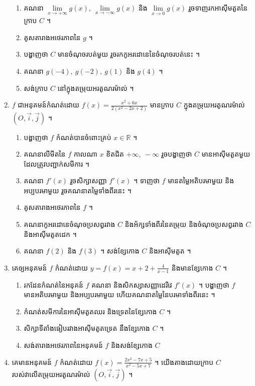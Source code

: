 \documentclass[12pt, a4paper]{article}
\begin{document}
\begin{enumerate}[m]
		\begin{enumerate}[k]
			\item គណនា $\lim\limits_{x\to+\infty}g(x),~\lim\limits_{x\to-\infty}g(x)$ និង $\lim\limits_{x\to0}g(x)$ រួចទាញរកអាស៊ីមតូតនៃក្រាប $C$ ។
			\item គូសតារាងអថេរភាពនៃ $g$ ។
			\item បង្ហាញថា $C$ មានចំណុចរបត់មួយ រួចរកកូអរដោនេនៃចំណុចរបត់នេះ ។
			\item គណនា $g(-4),~g(-2),~g(1)$ និង $g(4)$ ។
			\item សង់ក្រាប $C$ នៅក្នុងតម្រុយអរតូណរម៉ាល់ ។
		\end{enumerate}
	\item $f$ ជាអនុគមន៍កំណត់ដោយ $f(x)=\frac{x^2+6x}{2\left(x^2-2x+2\right)}$ មានក្រាប $C$ ក្នុងតម្រុយអរតូណរម៉ាល់ $\left(O, \vec{i}, \vec{j}\right)$ ។
		\begin{enumerate}[k]
			\item បង្ហាញថា $f$ កំណត់បានចំពោះគ្រប់ $x\in\mathbb{R}$ ។
			\item គណនាលីមីតនៃ $f$ កាលណា $x$ ខិតជិត $+\infty,~-\infty$ រួចបង្ហាញថា $C$ មានអាស៊ីមតូតមួយ ដែលត្រូវបញ្ជាក់សមីការ ។
			\item គណនា $f'(x)$ រួចសិក្សាសញ្ញា $f'(x)$ ។ ទាញថា $f$ មានតម្លៃអតិបរមាមួយ និងអប្បបរមាមួយ រួចគណនាតម្លៃទាំងពីរនេះ ។
			\item គូសតារាងអថេរភាពនៃ $f$ ។
			\item គណនាកូអរដោនេចំណុចប្រសព្វរវាង $C$ និងអ័ក្សទាំងពីរនៃតម្រុយ និងចំណុចប្រសព្វរវាង $C$ និងអាស៊ីមតូតដេក ។
			\item គណនា $f(2)$ និង $f(3)$ ។ សង់ខ្សែកោង $C$ និងអាស៊ីមតូត ។ 
		\end{enumerate}
	\item គេឲ្យអនុគមន៍ $f$ កំណត់ដោយ $y=f(x)=x+2+\frac{4}{x-1}$ និងមានខ្សែកោង $C$ ។
	\begin{enumerate}[k]
		\item រកដែនកំណត់នៃអនុគន៍ $f$ គណនា និងសិកស្សាសញ្ញាដេរីវេ $f'(x)$ ។ បង្ហាញថា $f$ មានអតិបរមាមួយ និងអប្បបរមាមួយ ហើយគណនាតម្លៃនៃបរមាទាំងពីរនេះ ។
		\item កំណត់សមីការនៃអាស៊ីមតូតឈរ និងទ្រេតនៃខ្សែកោង $C$ ។
		\item សិក្សាទីតាំងធៀបរវាងអាស៊ីមតូតទ្រេត នឹងខ្សែកោង $C$ ។
		\item សង់តារាងអថេរភាពនៃអនុគមន៍ $f$ និងសង់ខ្សែកោង $C$
	\end{enumerate}
	\item គេមានអនុគមន៍ $f$ កំណត់ដោយ $f(x)=\frac{2x^2-7x+5}{x^2-5x+7}$ ។ យើងតាងដោយក្រាប $C$ របស់វាលើតម្រុយអរតូណរម៉ាល់ $\left(O, \vec{i}, \vec{j}\right)$ ។

\end{enumerate}
\end{document}
